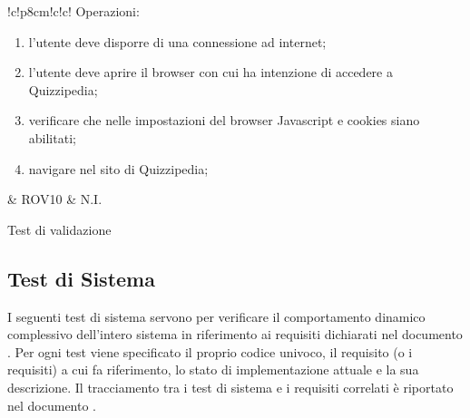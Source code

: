 \documentclass[a4paper, titlepage]{article}
\begin{document}
\begin{tabella}{!{\VRule}c!{\VRule}p{8cm}!{\VRule}c!{\VRule}c!{\VRule}}
		\newline \newline
		Operazioni:
		{\begin{enumerate}
				\item l’utente deve disporre di una connessione ad internet;
				\item l’utente deve aprire il browser con cui ha intenzione di accedere a Quizzipedia;
				\item verificare che nelle impostazioni  del browser Javascript e cookies siano abilitati;
				\item navigare nel sito di Quizzipedia; 
		\end{enumerate}
		}
	& ROV10 & N.I.
	\\
	\caption{Test di validazione}
\end{tabella}


\newpage
\subsection{Test di Sistema}
I seguenti test di sistema servono per verificare il comportamento dinamico complessivo dell'intero sistema in riferimento ai requisiti dichiarati nel documento .
\newline Per ogni test viene specificato il proprio codice univoco, il requisito (o i requisiti) a cui fa riferimento, lo stato di implementazione attuale e la sua descrizione.
\newline Il tracciamento tra i test di sistema e i requisiti correlati è riportato nel documento .
\end{document}
